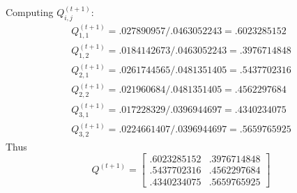 \documentclass[11pt, oneside]{article}   	%
\begin{document}
Computing $Q_{i, j}^{(t + 1)}$:
\begin{gather*}
Q_{1, 1}^{(t + 1)} = .027890957 / .0463052243 = .6023285152\\
Q_{1, 2}^{(t + 1)} = .0184142673 / .0463052243 = .3976714848\\
Q_{2, 1}^{(t + 1)} = .0261744565 / .0481351405 = .5437702316\\
Q_{2, 2}^{(t + 1)} = .021960684 / .0481351405 = .4562297684\\
Q_{3, 1}^{(t + 1)} = .017228329 / .0396944697 = .4340234075\\
Q_{3, 2}^{(t + 1)} = .0224661407 / .0396944697 = .5659765925
\end{gather*}
Thus \[
   Q^{(t + 1)} =
  \left[ {\begin{array}{cc}
  .6023285152 & .3976714848\\
  .5437702316 & .4562297684\\
  .4340234075 & .5659765925
  \end{array} } \right]
\]
\end{document}
